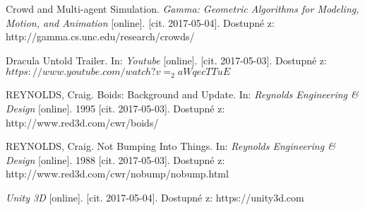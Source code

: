 \begin{thebibliography}{99}

Crowd and Multi-agent Simulation. \textit{Gamma: Geometric Algorithms for Modeling, Motion, and Animation} [online]. [cit. 2017-05-04]. Dostupné z: http://gamma.cs.unc.edu/research/crowds/

Dracula Untold Trailer. In: \textit{Youtube} [online]. [cit. 2017-05-03]. Dostupné z: $https://www.youtube.com/watch?v=_2aWqecTTuE$

REYNOLDS, Craig. Boids: Background and Update. In: \textit{Reynolds Engineering \& Design} [online]. 1995 [cit. 2017-05-03]. Dostupné z: http://www.red3d.com/cwr/boids/

REYNOLDS, Craig. Not Bumping Into Things. In: \textit{Reynolds Engineering \& Design} [online]. 1988 [cit. 2017-05-03]. Dostupné z: http://www.red3d.com/cwr/nobump/nobump.html

\textit{Unity 3D} [online]. [cit. 2017-05-04]. Dostupné z: https://unity3d.com


\end{thebibliography}